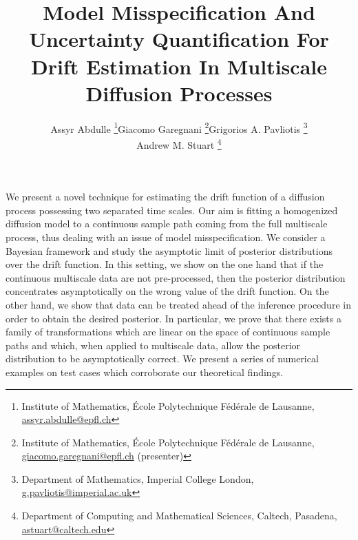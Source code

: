 \documentclass{article}
\title{Model Misspecification And Uncertainty Quantification For Drift Estimation In Multiscale Diffusion Processes}
\author{\begin{tabular}{ccc}
		Assyr Abdulle \thanks{Institute of Mathematics, École Polytechnique Fédérale de
		Lausanne, \href{mailto:assyr.abdulle@epfl.ch}{assyr.abdulle@epfl.ch}}
		& Giacomo Garegnani \thanks{Institute of Mathematics, École Polytechnique Fédérale de Lausanne, \href{mailto:giacomo.garegnani@epfl.ch}{giacomo.garegnani@epfl.ch} (presenter)}
		& Grigorios A. Pavliotis \thanks{Department of Mathematics, Imperial College London, \href{mailto:g.pavliotis@imperial.ac.uk}{g.pavliotis@imperial.ac.uk}}
		\\ & Andrew M. Stuart \thanks{Department of Computing and Mathematical Sciences, Caltech, Pasadena, \href{mailto:astuart@caltech.edu}{astuart@caltech.edu}} &
		\end{tabular}}
\date{}
\begin{document}
\maketitle

\noindent We present a novel technique for estimating the drift function of a diffusion process possessing two separated time scales. Our aim is fitting a homogenized diffusion model to a continuous sample path coming from the full multiscale process, thus dealing with an issue of model misspecification. We consider a Bayesian framework and study the asymptotic limit of posterior distributions over the drift function. In this setting, we show on the one hand that if the continuous multiscale data are not pre-processed, then the posterior distribution concentrates asymptotically on the wrong value of the drift function. On the other hand, we show that data can be treated ahead of the inference procedure in order to obtain the desired posterior. In particular, we prove that there exists a family of transformations which are linear on the space of continuous sample paths and which, when applied to multiscale data, allow the posterior distribution to be asymptotically correct. We present a series of numerical examples on test cases which corroborate our theoretical findings.
\end{document}
